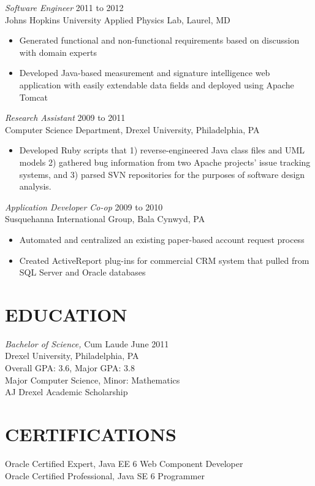 \documentclass[line]{res}
\begin{document}
\begin{resume}
{\sl Software Engineer} \hfill 2011 to 2012 \\
Johns Hopkins University Applied Physics Lab, Laurel, MD
\begin{itemize}  \itemsep -2pt
\item Generated functional and non-functional requirements based on discussion with domain experts
\item Developed Java-based measurement and signature intelligence web application with easily extendable data fields and deployed using Apache Tomcat
\end{itemize}

{\sl Research Assistant} \hfill            2009 to 2011 \\
Computer Science Department, Drexel University, Philadelphia, PA
\begin{itemize}  \itemsep -2pt
\item Developed Ruby scripts that 1) reverse-engineered Java class files and UML models 2) gathered bug information from two Apache projects’ issue tracking systems, and 3) parsed SVN repositories for the purposes of software design analysis.
\end{itemize}

{\sl Application Developer Co-op} \hfill        2009 to 2010 \\
Susquehanna International Group, Bala Cynwyd, PA
\begin{itemize}  \itemsep -2pt
\item Automated and centralized an existing paper-based account request process
\item Created ActiveReport plug-ins for commercial CRM system that pulled from SQL Server and Oracle databases
\end{itemize}

\section{EDUCATION}
{\sl Bachelor of Science,} Cum Laude \hfill June 2011 \\
Drexel University, Philadelphia, PA \\
Overall GPA: 3.6, Major GPA: 3.8 \\
Major Computer Science, Minor: Mathematics \\
AJ Drexel Academic Scholarship

\section{CERTIFICATIONS}
Oracle Certified Expert, Java EE 6 Web Component Developer \\
Oracle Certified Professional, Java SE 6 Programmer

\end{resume}
\end{document}
